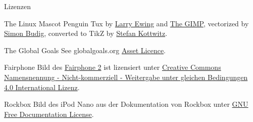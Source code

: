 \documentclass[t]{beamer}
\begin{document}

\begin{frame}{Lizenzen}
    \begin{block}{The Linux Mascot}
        Penguin Tux by \href{mailto:lewing@isc.tamu.edu}{Larry Ewing}
        and \href{http://isc.tamu.edu/~lewing/linux/}{The GIMP},
        vectorized by \href{http://www.home.unix-ag.org/simon/}{Simon Budig},
        converted to TikZ by
        \href{http://www.texample.net/weblog/2012/apr/28/tux-tex-tikz/}{Stefan Kottwitz}.
    \end{block}
    \begin{block}{The Global Goals}
        See globalgoals.org
        \href{https://www.globalgoals.org/asset-licence}{Asset Licence}.
    \end{block}
    \begin{block}{Fairphone}
        Bild des \href{https://shop.fairphone.com/de/}{Fairphone 2} ist
        lizensiert unter
        \href{https://creativecommons.org/licenses/by-nc-sa/4.0/}{Creative
        Commons Namensnennung - Nicht-kommerziell - Weitergabe unter
        gleichen Bedingungen 4.0 International Lizenz}.
    \end{block}
    \begin{block}{Rockbox}
        Bild des iPod Nano aus der Dokumentation von Rockbox unter
        \href{https://download.rockbox.org/daily/manual/rockbox-ipodnano2g/rockbox-buildap9.html}{GNU Free Documentation License}.
    \end{block}
\end{frame}
\end{document}
